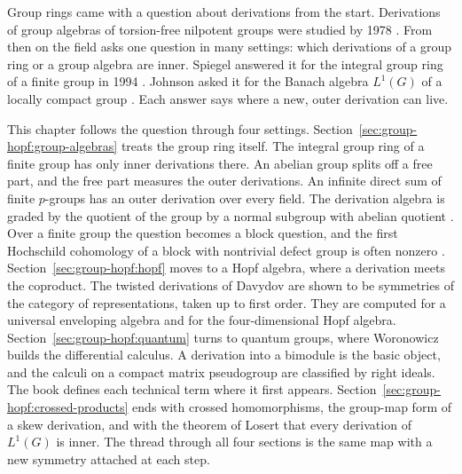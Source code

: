 Group rings came with a question about derivations from the start. Derivations of
group algebras of torsion-free nilpotent groups were studied by 1978
\cite[p.~434]{FerreroGiambrunoPolcinoMilies1995}. From then on the field asks one
question in many settings: which derivations of a group ring or a group algebra are
inner. Spiegel answered it for the integral group ring of a finite group in 1994
\cite[p.~2955]{Spiegel1994}. Johnson asked it for the Banach algebra $L^{1}(G)$ of
a locally compact group \cite[p.~221]{Losert2008}. Each answer says where a new,
outer derivation can live.

This chapter follows the question through four settings.
Section~\ref{sec:group-hopf:group-algebras} treats the group ring itself. The
integral group ring of a finite group has only inner derivations there. An abelian
group splits off a free part, and the free part measures the outer derivations. An
infinite direct sum of finite $p$-groups has an outer derivation over every field.
The derivation algebra is graded by the quotient of the group by a normal
subgroup with abelian quotient
\cite[Theorem~1, pp.~1, 8]{ArutyunovZhiltsov2023}. Over a finite group the
question becomes a block question, and the first Hochschild cohomology of a
block with nontrivial defect group is often nonzero
\cite[Theorem~A, p.~2]{AntrobusBriggsRubioDegrassi2026}.
Section~\ref{sec:group-hopf:hopf} moves to a Hopf algebra, where a derivation meets
the coproduct. The twisted derivations of Davydov are shown to be symmetries of the
category of representations, taken up to first order. They are computed for a
universal enveloping algebra and for the four-dimensional Hopf algebra.
Section~\ref{sec:group-hopf:quantum} turns to quantum groups, where Woronowicz
builds the differential calculus. A derivation into a bimodule is the basic object,
and the calculi on a compact matrix pseudogroup are classified by right ideals.
The book defines each technical term where it first appears.
Section~\ref{sec:group-hopf:crossed-products} ends with crossed homomorphisms, the
group-map form of a skew derivation, and with the theorem of Losert that every derivation
of $L^{1}(G)$ is inner. The thread through all four sections is the same map with a
new symmetry attached at each step.

